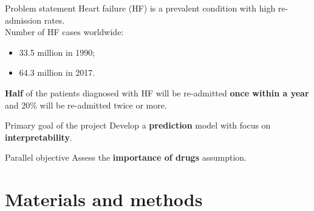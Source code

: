\documentclass[aspectratio=169,xcolor=dvipsnames]{beamer}
\begin{document}
\begin{frame}{Problem statement}
    Heart failure (HF) is a prevalent condition with high re-admission rates.\\
    Number of HF cases worldwide:
    \begin{itemize}
        \item 33.5 million in 1990;
        \item 64.3 million in 2017.
    \end{itemize}
    
    \textbf{Half} of the patients diagnosed with HF will be re-admitted \textbf{once within a year} and 20\% will be re-admitted twice or more.
    \pause
    \begin{block}{Primary goal of the project}
        Develop a \textbf{prediction} model with focus on \textbf{interpretability}.
    \end{block}

    \begin{block}{Parallel objective}
        Assess the \textbf{importance of drugs} assumption.
    \end{block}

\end{frame}



\section{Materials and methods}

\end{document}
